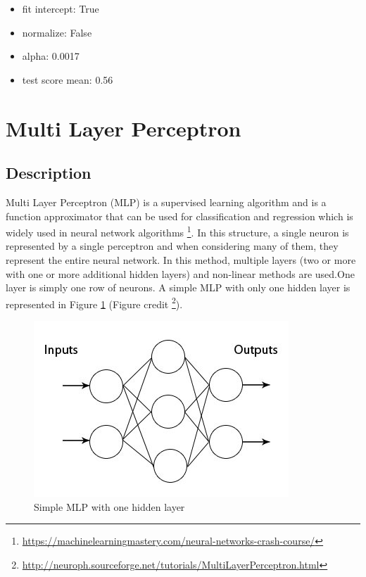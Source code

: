 \documentclass[twocolumn]{scrartcl}
\begin{document}
\begin{itemize}
    \item{fit intercept: True}
    \item{normalize: False}
    \item{alpha: 0.0017}
    \item{test score mean: 0.56}
\end{itemize}

\section{Multi Layer Perceptron}
\subsection{Description}
Multi Layer Perceptron (MLP) is a supervised learning algorithm and is a function approximator that can be used for classification and regression which is widely used in neural network algorithms \footnote{\url{https://machinelearningmastery.com/neural-networks-crash-course/}}.
In this structure, a single neuron is represented by a single perceptron and when considering many of them, they represent the entire neural network. In this method, multiple layers (two or more with one or more additional hidden layers) and non-linear methods are used.One layer is simply one row of neurons. A simple MLP with only one hidden layer is represented in Figure \ref{fig:mlp} (Figure credit \footnote{\url{http://neuroph.sourceforge.net/tutorials/MultiLayerPerceptron.html}}).

\begin{figure}[h]
    \centering
    \includegraphics[width=\linewidth]{images/mlp.jpeg}
    \caption{Simple MLP with one hidden layer}
    \label{fig:mlp}
\end{figure}
\end{document}
